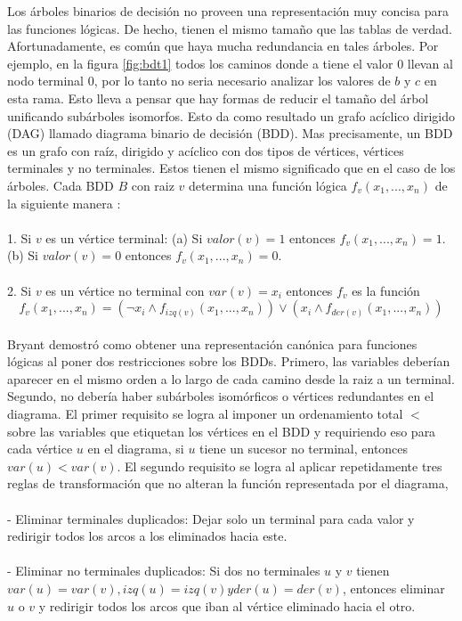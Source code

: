 \noindent Los árboles binarios de decisión no proveen una representación muy concisa para las funciones lógicas. De hecho, tienen el mismo tamaño que las tablas de verdad. Afortunadamente, es común que haya mucha redundancia en tales árboles. Por ejemplo, en la figura \ref{fig:bdt1} todos los caminos donde a tiene el valor 0 llevan al nodo terminal 0, por lo tanto no seria necesario analizar los valores de $b$ y $c$ en esta rama. Esto lleva a pensar que hay formas de reducir el tamaño del árbol unificando subárboles isomorfos. Esto da como resultado un grafo acíclico dirigido (DAG) llamado diagrama binario de decisión (BDD). Mas precisamente, un BDD es un grafo con raíz, dirigido y acíclico con dos tipos de vértices, vértices terminales y no terminales. Estos tienen el mismo significado que en el caso de los árboles. Cada BDD $B$ con raiz $v$ determina una función lógica $f_{v}(x_{1},...,x_{n})$ de la siguiente manera \cite{Clarke:1}:\\
\\
1. Si $v$ es un vértice terminal:
  (a) Si $valor(v) = 1$ entonces $f_{v}(x_{1},...,x_{n}) = 1$.
  (b) Si $valor(v) = 0$ entonces $f_{v}(x_{1},...,x_{n}) = 0$.\\
\\
2. Si $v$ es un vértice no terminal con $var(v) = x_{i}$ entonces $f_{v}$ es la función 
\[f_{v}(x_{1},...,x_{n}) = (\neg x_{i} \land f_{izq(v)}(x_{1},...,x_{n})) \lor (x_{i} \land f_{der(v)}(x_{1},...,x_{n}))\]\\
\noindent Bryant \cite{Bryant:8} demostró como obtener una representación canónica para funciones lógicas al poner dos restricciones sobre los BDDs. Primero, las variables deberían aparecer en el mismo orden a lo largo de cada camino desde la raiz a un terminal. Segundo, no debería haber subárboles isomórficos o vértices redundantes en el diagrama. El primer requisito se logra al imponer un ordenamiento total $<$ sobre las variables que etiquetan los vértices en el BDD y requiriendo eso para cada vértice $u$ en el diagrama, si $u$ tiene un sucesor no terminal, entonces $var(u) < var(v)$. El segundo requisito se logra al aplicar repetidamente tres reglas de transformación que no alteran la función representada por el diagrama, \\
\\
- Eliminar terminales duplicados: Dejar solo un terminal para cada valor y redirigir todos los arcos a los eliminados hacia este.\\
\\
- Eliminar no terminales duplicados: Si dos no terminales $u$ y $v$ tienen $var(u) = var(v), izq(u) = izq(v) y der(u) = der(v)$, entonces eliminar $u$ o $v$ y redirigir todos los arcos que iban al vértice eliminado hacia el otro.\\
